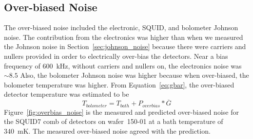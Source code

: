 








\subsection{Over-biased Noise}
\label{sec:over_biased_noise}

The over-biased noise included the electronic, \ac{SQUID}, and bolometer Johnson noise. 
The contribution from the electronics was higher than when we measured the Johnson noise in Section~\ref{sec:johnson_noise} because there were carriers and nullers provided in order to electrically over-bias the detectors. 
Near a bias frequency of 600~kHz, without carriers and nullers on, the electronics noise was $\sim8.5$
Also, the bolometer Johnson noise was higher because when over-biased, the bolometer temperature was higher. 
From Equation~\ref{eq:gbar}, the over-biased detector temperature was estimated to be
\begin{equation}
T_{bolometer} = T_{bath} + P_{overbias}* \overline{G}
\end{equation}
Figure~\ref{fig:overbias_noise} is the measured and predicted over-biased noise for the \ac{SQUID}7 comb of detectors on wafer~150-01 at a bath temperature of 340~mK. 
The measured over-biased noise agreed with the prediction. 


